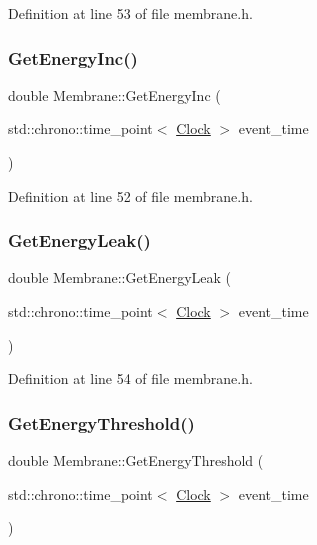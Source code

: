 Definition at line 53 of file membrane.\+h.

\mbox{\label{class_membrane_a00e038f0023186139467d490c6cd38a3}} 
\subsubsection{\texorpdfstring{Get\+Energy\+Inc()}{GetEnergyInc()}}
{\footnotesize\ttfamily double Membrane\+::\+Get\+Energy\+Inc (\begin{DoxyParamCaption}\item[{std\+::chrono\+::time\+\_\+point$<$ \hyperlink{universe_8h_a0ef8d951d1ca5ab3cfaf7ab4c7a6fd80}{Clock} $>$}]{event\+\_\+time }\end{DoxyParamCaption})\hspace{0.3cm}{\ttfamily [inline]}}



Definition at line 52 of file membrane.\+h.

\mbox{\label{class_membrane_ac6c8d1f7348b24e448e8163260500b89}} 
\subsubsection{\texorpdfstring{Get\+Energy\+Leak()}{GetEnergyLeak()}}
{\footnotesize\ttfamily double Membrane\+::\+Get\+Energy\+Leak (\begin{DoxyParamCaption}\item[{std\+::chrono\+::time\+\_\+point$<$ \hyperlink{universe_8h_a0ef8d951d1ca5ab3cfaf7ab4c7a6fd80}{Clock} $>$}]{event\+\_\+time }\end{DoxyParamCaption})\hspace{0.3cm}{\ttfamily [inline]}}



Definition at line 54 of file membrane.\+h.

\mbox{\label{class_membrane_a7ce7398888bdad73ac848a2362261acf}} 
\subsubsection{\texorpdfstring{Get\+Energy\+Threshold()}{GetEnergyThreshold()}}
{\footnotesize\ttfamily double Membrane\+::\+Get\+Energy\+Threshold (\begin{DoxyParamCaption}\item[{std\+::chrono\+::time\+\_\+point$<$ \hyperlink{universe_8h_a0ef8d951d1ca5ab3cfaf7ab4c7a6fd80}{Clock} $>$}]{event\+\_\+time }\end{DoxyParamCaption})\hspace{0.3cm}{\ttfamily [inline]}}



